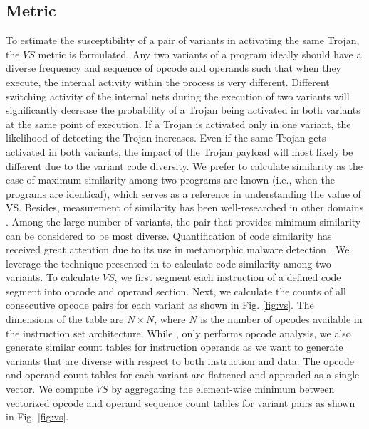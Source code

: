 \documentclass[conference]{IEEEtran}
\begin{document}


\subsection{Metric}

To estimate the susceptibility  of a pair of variants in activating the same Trojan, the $VS$ metric is formulated. Any two variants of a program ideally should have a diverse frequency and sequence of opcode and operands such that when they execute, the internal activity within the process is very different. Different switching activity of the internal nets during the execution of two variants will significantly decrease the probability of a Trojan being activated in both variants at the same point of execution. If a Trojan is activated only in one variant, the likelihood of detecting the Trojan increases. Even if the same Trojan gets activated in both variants, the impact of the Trojan payload will most likely be different due to the variant code diversity. We prefer to calculate similarity as the case of maximum similarity among two programs are known (i.e., when the programs are identical), which serves as a reference in understanding the value of VS. Besides, measurement of similarity has been well-researched in other domains \cite{runwal2012opcode}.  Among the large number of variants, the pair that provides minimum similarity can be considered to be most diverse. Quantification of code similarity has received great attention due to its use in metamorphic malware detection \cite{zhang2007metaaware, runwal2012opcode}. We leverage the technique presented in \cite{runwal2012opcode} to calculate code similarity among two variants. To calculate $VS$, we first segment each instruction of a defined code segment into opcode and operand section. Next, we calculate the counts of all consecutive opcode pairs for each variant as shown in Fig. \ref{fig:vs}. The dimensions of the table are $N \times N$, where $N$ is the number of opcodes available in the instruction set architecture. While \cite{runwal2012opcode}, only performs opcode analysis, we also generate similar count tables for instruction operands as we want to generate variants that are diverse with respect to both instruction and data. The opcode and operand count tables for each variant are flattened and appended as a single vector. We compute $VS$ by aggregating the element-wise minimum between vectorized opcode and operand  sequence count tables for variant pairs as shown in Fig. \ref{fig:vs}.
\end{document}
